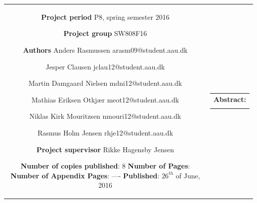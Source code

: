 \begin{nopagebreak}
{\begin{tabular}{cc}
{        \textbf{Project period} \\ 
        P8, spring semester 2016 \\

        \textbf{Project group} \\
        SW808F16 \\

        \textbf{Authors} \\
        Anders Rasmussen\\
        arasm09@student.aau.dk
        \\\\ 
        Jesper Clausen\\
        jclau12@student.aau.dk
        \\\\ 
        Martin Damgaard Nielsen\\
        mdni12@student.aau.dk
        \\\\ 
        Mathias Eriksen Otkjær\\
        meot12@student.aau.dk
        \\\\ 
        Niklas Kirk Mouritzsen\\
        nmouri12@student.aau.dk
        \\\\ 
        Rasmus Holm Jensen\\
        rhje12@student.aau.dk
        \\\\
        \textbf{Project supervisor} \\ 
        Rikke Hagensby Jensen \\

        \textbf{Number of copies published}: 8 \\
        \textbf{Number of Pages}: \pageref{LastPage} \\
        \textbf{Number of Appendix Pages}: ---- \\
        \textbf{Published}: $26^{th}$ of June, 2016 \\

        \vfill 

        } &
    \parbox{7cm}
    {
        \vspace{.15cm}
        \hfill 
        \begin{tabular}{l}
            {\bf Abstract:}\bigskip \\
            \fbox{
                \parbox{7cm}
                {
                    \bigskip
                    {\vfill{\small \bigskip}}
                }
            }
        \end{tabular}
    }

\end{tabular}}
\begin{center}
\end{center}

\restoregeometry
\end{nopagebreak}
